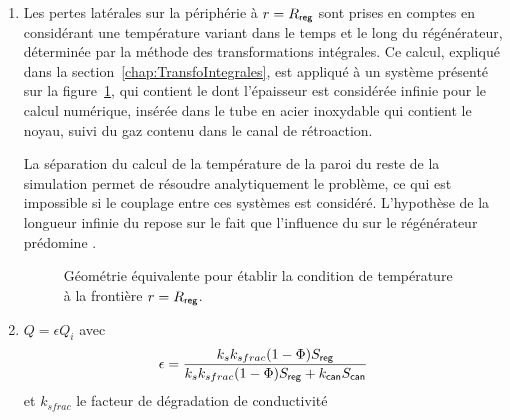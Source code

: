 \begin{enumerate}[label=\textbf{(\roman*)}]
%
%


\item Les pertes latérales sur la périphérie à $r=R_{\sf reg}$ sont prises en comptes en considérant une température variant dans le temps et le long du régénérateur, déterminée par la méthode des transformations intégrales. Ce calcul, expliqué dans la section~\ref{chap:TransfoIntegrales}, est appliqué à un système présenté sur la figure~\ref{fig:TemperatureCanisterConditionLimite}, qui contient le  dont l'épaisseur est considérée infinie pour le calcul numérique, insérée dans le tube en acier inoxydable qui contient le noyau, suivi du gaz contenu dans le canal de rétroaction.

La séparation du calcul de la température de la paroi du reste de la simulation permet de résoudre analytiquement le problème, ce qui est impossible si le couplage entre ces systèmes est considéré. L'hypothèse de la longueur infinie du  repose sur le fait que l'influence du  sur le régénérateur prédomine .


\begin{figure}[!ht]
    \centering
    
    \caption{Géométrie équivalente pour établir la condition de température à la frontière $r=R_{\sf reg}$. }
    \label{fig:TemperatureCanisterConditionLimite}
\end{figure}

\item {}

$Q=\epsilon Q_i$ avec 
\begin{equation}
	\epsilon = \frac{k_s k_{sfrac} (1-\Phi)S_{\sf reg}}{k_s k_{sfrac} (1-\Phi)S_{\sf reg} + k_{\sf can} S_{\sf can}}
\end{equation}
et $k_{sfrac}$ le facteur de dégradation de conductivité \cite{lewis_measurement_1998}

\end{enumerate}

